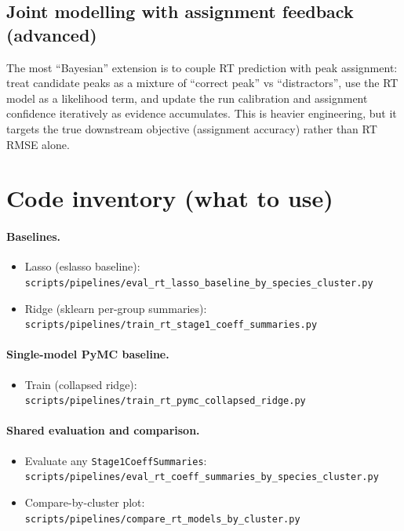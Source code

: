 \documentclass[11pt]{article}
\begin{document}
\subsection{Joint modelling with assignment feedback (advanced)}

The most ``Bayesian'' extension is to couple RT prediction with peak assignment: treat candidate peaks as a mixture of
``correct peak'' vs ``distractors'', use the RT model as a likelihood term, and update the run calibration and assignment confidence
iteratively as evidence accumulates. This is heavier engineering, but it targets the true downstream objective (assignment accuracy)
rather than RT RMSE alone.

\section{Code inventory (what to use)}

\paragraph{Baselines.}
\begin{itemize}
  \item Lasso (eslasso baseline): \texttt{scripts/pipelines/eval\_rt\_lasso\_baseline\_by\_species\_cluster.py}
  \item Ridge (sklearn per-group summaries): \texttt{scripts/pipelines/train\_rt\_stage1\_coeff\_summaries.py}
\end{itemize}

\paragraph{Single-model PyMC baseline.}
\begin{itemize}
  \item Train (collapsed ridge): \texttt{scripts/pipelines/train\_rt\_pymc\_collapsed\_ridge.py}
\end{itemize}

\paragraph{Shared evaluation and comparison.}
\begin{itemize}
  \item Evaluate any \texttt{Stage1CoeffSummaries}: \texttt{scripts/pipelines/eval\_rt\_coeff\_summaries\_by\_species\_cluster.py}
  \item Compare-by-cluster plot: \texttt{scripts/pipelines/compare\_rt\_models\_by\_cluster.py}
\end{itemize}
\end{document}
